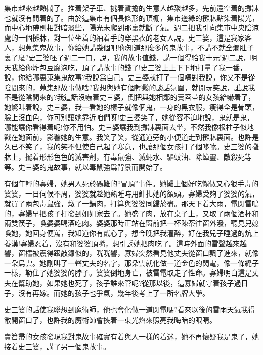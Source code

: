 \documentclass[a6paper]{article}
\begin{document}
集市越來越熱鬧了。推着架子車、挑着貨擔的生意人越聚越多，先前還空着的攤牀也就沒有閒着的了。由於這集市有個長條形的頂棚，集市邊緣的攤牀點染着陽光，而中心地帶則相對暗淡些，陽光未爬到那裏就斷了氣。週二把我引向集市中央陰涼處的一個攤牀，對一位坐着的袖着手的穿黑衣的老女人說，史三婆，這是我家客人，想蒐集鬼故事，你給她講幾個吧!你知道那麼多的鬼故事，不講不就全爛肚子裏了麼?史三婆呸了週二一口，說，我的故事值錢，講一個得給我十元!週二說，明天我給你炸包豆腐泡吃，頂了講故事的錢了!史三婆上上下下地打量了我一番，說，你給哪裏蒐集鬼故事?我說爲自己。史三婆就打了一個嗝對我說，你又不是從陰間來的，蒐集那故事做啥?我想與她有個輕鬆的談話氛圍，就開玩笑說，誰說我不是從陰間來的?我這話沒嚇着史三婆，倒把與她相鄰的賣笤帚的女孩給嚇着了，她驚叫着說，史三婆，我一看她的樣子就像個鬼，一身的黑衣服，瘦得全是骨頭，臉上沒血色，你可別讓她靠近咱們呀!史三婆笑了，她從容不迫地說，鬼就是鬼，哪能讓你看得着呢!你不用怕。史三婆讓我到攤牀裏面去坐，不然我像根柱子似地戳在她面前，影響她的生意。我笑了笑，從通道旁的小便道走到攤牀裏面。也許是久已不笑了，我的笑不但使自己起了寒意，也讓那個女孩打了個哆嗦。史三婆的攤牀上，擺着形形色色的滅害劑，有毒鼠強、滅蠅水、驅蚊油、除蟑靈、敵殺死等等。史三婆的鬼故事，就以毒鼠強爲背景而開始了。

有個年輕的寡婦，她男人死於礦難的“冒頂”事件。她攤上個好吃懶做又心狠手毒的婆婆，一日伺候不周，婆婆就趁她熟睡時用針扎她的額頭。寡婦受夠了婆婆的氣，就買了兩包毒鼠強，燉了一鍋肉，打算與婆婆同歸於盡。那天下着大雨，電閃雷鳴的，寡婦早把孩子打發到姐姐家去了。她盛了肉，放在桌子上，又取了兩個酒杯和兩雙筷子，喚婆婆喝酒吃肉。婆婆那時正站在窗前把一杯陳茶往窗外潑，聽見兒媳喚她，她回身便罵，我知道你有貳心了，想今晚把我灌醉，好在我兒子睡過的炕上養漢!寡婦忍着，沒有和婆婆頂嘴，想引誘她把肉吃了。這時外面的雷聲越來越響，窗櫺被震得跟敲鑼似的，咣咣響，寡婦突然看見他丈夫從窗口飄了進來，就像一朵烏雲。她剛叫了一聲丈夫的名字，那朵雲就化做一道金色的閃電，像一條繩子一樣，勒住了她婆婆的脖子。婆婆倒地身亡，被雷電取走了性命。寡婦明白這是丈夫在幫助她，如果她也死了，孩子誰來管呢?從那以後，這寡婦就守着孩子過日子，沒有再嫁。而她的孩子也爭氣，幾年後考上了一所名牌大學。

史三婆的話使我聯想到魔術師，他也會化做一道閃電嗎?看來以後的雷雨天氣我得敞開窗口了，也許我的魔術師會挾着一束光焰來照亮我晦暗的眼睛。

賣笤帚的女孩發現我對鬼故事確實有着與人一樣的着迷，她不再懷疑我是鬼了，她接着史三婆，講了另一個鬼故事。
\end{document}
